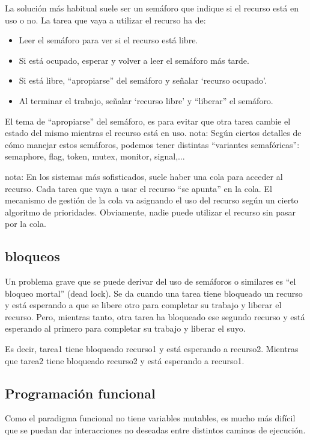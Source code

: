 \documentclass[spanish,12pt,a4paper,final,oneside]{book}
\begin{document}
La solución más habitual suele ser un semáforo  que indique si el recurso está en uso o no. La tarea que vaya a utilizar el recurso ha de:
\begin{itemize}
\item Leer el semáforo para ver si el recurso está libre.
\item Si está ocupado, esperar y volver a leer el semáforo más tarde.
\item Si está libre, ``apropiarse'' del semáforo y señalar `recurso ocupado'.
\item Al terminar el trabajo, señalar `recurso libre' y ``liberar'' el semáforo.
\end{itemize}

El tema de ``apropiarse'' del semáforo, es para evitar que otra tarea cambie el estado del mismo mientras el recurso está en uso.
nota: Según ciertos detalles de cómo manejar estos semáforos, podemos tener distintas ``variantes semafóricas'': semaphore, flag, token, mutex, monitor, signal,...

nota: En los sistemas más sofisticados, suele haber una cola para acceder al recurso. Cada tarea que vaya a usar el recurso ``se apunta'' en la cola. El mecanismo de gestión de la cola va asignando el uso del recurso según un cierto algoritmo de prioridades. Obviamente, nadie puede utilizar el recurso sin pasar por la cola.

\subsection{bloqueos}
Un problema grave que se puede derivar del uso de semáforos o similares es ``el bloqueo mortal'' (dead lock). Se da cuando una tarea tiene bloqueado un recurso y está esperando a que se libere otro para completar su trabajo y liberar el recurso. Pero, mientras tanto, otra tarea ha bloqueado ese segundo recurso y está esperando al primero para completar su trabajo y liberar el suyo.

Es decir, tarea1 tiene bloqueado recurso1 y está esperando a recurso2. Mientras que tarea2 tiene bloqueado recurso2 y está esperando a recurso1.


\subsection{Programación funcional}
Como el paradigma funcional no tiene variables mutables, es mucho más difícil que se puedan dar interacciones no deseadas entre distintos caminos de ejecución.
\end{document}
